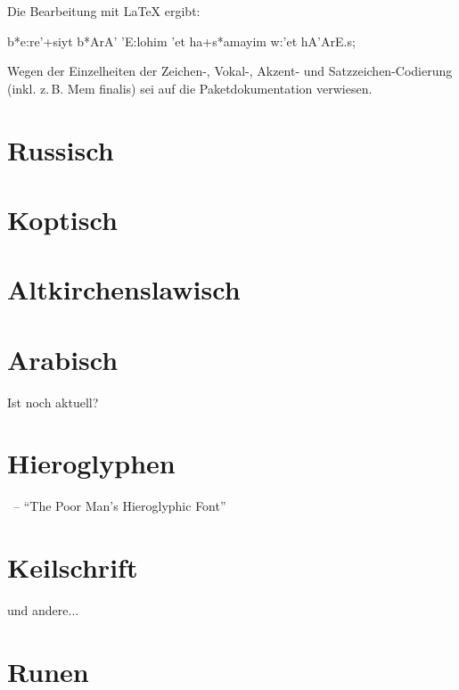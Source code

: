 Die Bearbeitung mit \LaTeX{} ergibt:

\begin{cjhebrew}
 b*e:re'+siyt b*ArA' 'E:lohim 'et ha+s*amayim w:'et hA'ArE.s;
\end{cjhebrew}

Wegen der Einzelheiten der Zeichen-, Vokal-, Akzent- und Satzzeichen-Codierung (inkl. z.\,B.
Mem finalis) sei auf die Paketdokumentation verwiesen.

\section{Russisch}

\section{Koptisch}

\section{Altkirchenslawisch}



\section{Arabisch}

Ist  noch aktuell?

\section{Hieroglyphen}

~-- \enquote{The Poor Man’s Hieroglyphic Font}




\section{Keilschrift}

 und andere...

\section{Runen}


